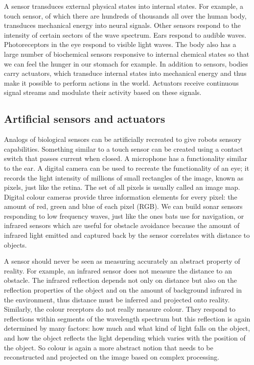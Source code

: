 A sensor transduces external physical 
states into internal states. For example, a touch sensor, of which 
there are hundreds of thousands all over the human body, 
transduces mechanical energy into neural signals. Other sensors
respond to the intensity of certain sectors of the wave spectrum. 
Ears respond to audible waves. Photoreceptors in the eye
respond to visible light waves. 
The body also has a large number of
biochemical sensors responsive to internal 
chemical states so that we can feel the hunger in our stomach for example. 
In addition to sensors, bodies carry 
actuators, which transduce internal states into mechanical 
energy and thus make it possible to perform actions in 
the world. Actuators receive continuous signal streams and modulate
their activity based on these signals. 

\subsection{Artificial sensors and actuators}

Analogs of biological sensors can be artificially recreated to give
robots sensory capabilities. Something similar to 
a touch sensor can be created using a contact switch 
that passes current when closed. A microphone has 
a functionality similar to the ear. 
A digital camera can be used to recreate the functionality of an eye; 
it records the light intensity of millions of small rectangles of 
the image, known as pixels, just like the retina. The set of 
all pixels is usually called an image map. Digital
colour cameras provide three information elements for 
every pixel: the amount of red, 
green and blue of each pixel (RGB). We 
can build sonar sensors responding
to low frequency waves, just like the ones bats use 
for navigation, or infrared sensors which are useful 
for obstacle avoidance because 
the amount of infrared light emitted and captured back
by the sensor correlates with distance to objects. 

A sensor should never be seen as measuring accurately 
an abstract property of reality. For example, an infrared sensor 
does not measure the distance to an obstacle. The infrared
reflection depends not only on distance but also
on the reflection properties 
of the object and on the amount of background infrared 
in the environment, thus distance must be inferred and projected onto
reality. Similarly, the colour receptors do not really measure
colour. They respond to reflections within segments of the wavelength spectrum 
but this reflection is again determined by many factors: how much and what kind of 
light falls on the object, and how the object reflects the light depending which varies 
with the position of the object. So colour is again a more abstract notion that needs to be 
reconstructed and projected on the image based on complex processing. 

